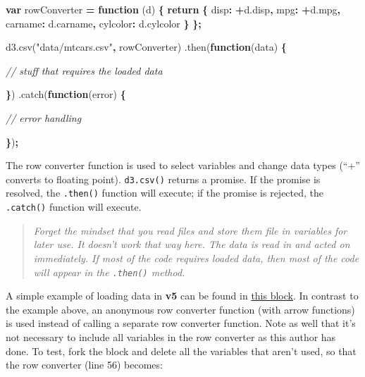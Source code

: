 \documentclass[openany]{book}
\newenvironment{Shaded}{\begin{snugshade}}{\end{snugshade}}
\newcommand{\AttributeTok}[1]{\textcolor[rgb]{0.77,0.63,0.00}{#1}}
\newcommand{\CommentTok}[1]{\textcolor[rgb]{0.56,0.35,0.01}{\textit{#1}}}
\newcommand{\ControlFlowTok}[1]{\textcolor[rgb]{0.13,0.29,0.53}{\textbf{#1}}}
\newcommand{\DataTypeTok}[1]{\textcolor[rgb]{0.13,0.29,0.53}{#1}}
\newcommand{\KeywordTok}[1]{\textcolor[rgb]{0.13,0.29,0.53}{\textbf{#1}}}
\newcommand{\NormalTok}[1]{#1}
\newcommand{\OperatorTok}[1]{\textcolor[rgb]{0.81,0.36,0.00}{\textbf{#1}}}
\newcommand{\StringTok}[1]{\textcolor[rgb]{0.31,0.60,0.02}{#1}}
\newcommand{\VariableTok}[1]{\textcolor[rgb]{0.00,0.00,0.00}{#1}}
\begin{document}
\begin{Shaded}
\begin{Highlighting}[]
\KeywordTok{var}\NormalTok{ rowConverter }\OperatorTok{=} \KeywordTok{function}\NormalTok{ (d) }\OperatorTok{\{}
  \ControlFlowTok{return} \OperatorTok{\{}
    \DataTypeTok{disp}\OperatorTok{:} \OperatorTok{+}\VariableTok{d}\NormalTok{.}\AttributeTok{disp}\OperatorTok{,}
    \DataTypeTok{mpg}\OperatorTok{:} \OperatorTok{+}\VariableTok{d}\NormalTok{.}\AttributeTok{mpg}\OperatorTok{,}
    \DataTypeTok{carname}\OperatorTok{:} \VariableTok{d}\NormalTok{.}\AttributeTok{carname}\OperatorTok{,}
    \DataTypeTok{cylcolor}\OperatorTok{:} \VariableTok{d}\NormalTok{.}\AttributeTok{cylcolor}
    \OperatorTok{\}}
\OperatorTok{\};}  

\VariableTok{d3}\NormalTok{.}\AttributeTok{csv}\NormalTok{(}\StringTok{"data/mtcars.csv"}\OperatorTok{,}\NormalTok{ rowConverter)}
\NormalTok{  .}\AttributeTok{then}\NormalTok{(}\KeywordTok{function}\NormalTok{(data) }\OperatorTok{\{}

\CommentTok{// stuff that requires the loaded data}

  \OperatorTok{\}}\NormalTok{)}
\NormalTok{  .}\AttributeTok{catch}\NormalTok{(}\KeywordTok{function}\NormalTok{(error) }\OperatorTok{\{}
  
\CommentTok{// error handling  }
  
  \OperatorTok{\}}\NormalTok{)}\OperatorTok{;}
\end{Highlighting}
\end{Shaded}

The row converter function is used to select variables and change data types (``+'' converts to floating point). \texttt{d3.csv()} returns a promise. If the promise is resolved, the \texttt{.then()} function will execute; if the promise is rejected, the \texttt{.catch()} function will execute.

\begin{quote}
 \emph{Forget the mindset that you read files and store them file in variables for later use. It doesn't work that way here. The data is read in and acted on immediately. If most of the code requires loaded data, then most of the code will appear in the \texttt{.then()} method.}
\end{quote}

A simple example of loading data in \textbf{v5} can be found in \href{https://blockbuilder.org/tiktaktok/c2e02e2916c226ef44ed233cb46db40c}{this block}. In contrast to the example above, an anonymous row converter function (with arrow functions) is used instead of calling a separate row converter function. Note as well that it's not necessary to include all variables in the row converter as this author has done. To test, fork the block and delete all the variables that aren't used, so that the row converter (line 56) becomes:
\end{document}
